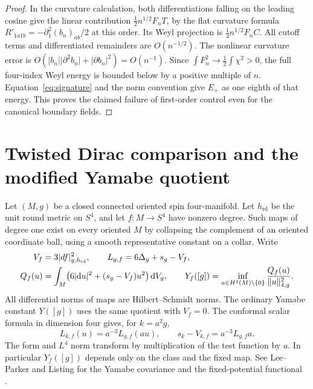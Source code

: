 \documentclass[11pt]{article}
\numberwithin{equation}{section}
\newcommand{\rd}{\mathrm{rd}}
\newcommand{\dd}{\mathrm{d}}
\newcommand{\Sphere}{S^4}
\newcommand{\abs}[1]{\lvert #1\rvert}
\newcommand{\norm}[1]{\lVert #1\rVert}
\newcommand{\dv}{\dd V_g}
\newcommand{\Y}{Y([g])}
\newcommand{\Yf}{Y_f([g])}
\begin{document}
\begin{proof}
In the curvature calculation, both differentiations falling on the
leading cosine give the linear contribution
\(\frac12 n^{1/2}F_n T\), by the flat curvature formula
\(R'_{1a1b}=-\partial_1^2(b_n)_{ab}/2\) at this order.
Its Weyl projection is \(\frac14n^{1/2}F_n C\).
All cutoff terms and differentiated remainders are \(O(n^{-1/2})\).
The nonlinear curvature error is
\(O(\abs{b_n}\abs{\partial^2b_n}+\abs{\partial b_n}^2)=O(n^{-1})\).
Since \(\int F_n^2\to\frac12\int\chi^2>0\), the full four-index
Weyl energy is bounded below by a positive multiple of \(n\).
Equation~\eqref{eq:signature} and the norm convention give \(E_+\)
as one eighth of that energy. This proves the claimed failure
of first-order control even for the canonical boundary fields.
\end{proof}

\section{Twisted Dirac comparison and the modified Yamabe quotient}\label{sec:twisted}

Let \((M,g)\) be a closed connected oriented spin four-manifold.
Let \(h_{\rd}\) be the unit round metric on \(\Sphere\), and let
\(f:M\to\Sphere\) have nonzero degree. Such maps of degree one exist
on every oriented \(M\) by collapsing the complement of an oriented
coordinate ball, using a smooth representative constant on a collar.
Write
\begin{align}
 V_f&=3\abs{df}_{g,h_{\rd}}^2,\qquad
 L_{g,f}=6\Delta_g+s_g-V_f,\notag\\
 Q_f(u)&=\int_M \bigl(6\abs{\dd u}^2+(s_g-V_f)u^2\bigr)\,\dv,\qquad
 \Yf=\inf_{u\in H^1(M)\setminus\{0\}}\frac{Q_f(u)}{\norm{u}_{4,g}^2}.
 \label{eq:modified}
\end{align}
All differential norms of maps are Hilbert--Schmidt norms.
The ordinary Yamabe constant \(\Y\) uses the same quotient with
\(V_f=0\). The conformal scalar formula in dimension four gives,
for \(k=a^2g\),
\begin{equation}\label{eq:conformal-L}
 L_{k,f}(u)=a^{-3}L_{g,f}(au),\qquad
 s_k-V_{k,f}=a^{-3}L_{g,f}a .
\end{equation}
The form and \(L^4\) norm transform by multiplication of the test
function by \(a\). In particular \(\Yf\) depends only on the class
and the fixed map. See Lee--Parker and Listing for the Yamabe
covariance and the fixed-potential functional~\cite[\S2]{LeeParker1987Yamabe}
\cite[\S2.2]{Listing2012ScalarBundles}.
\end{document}
